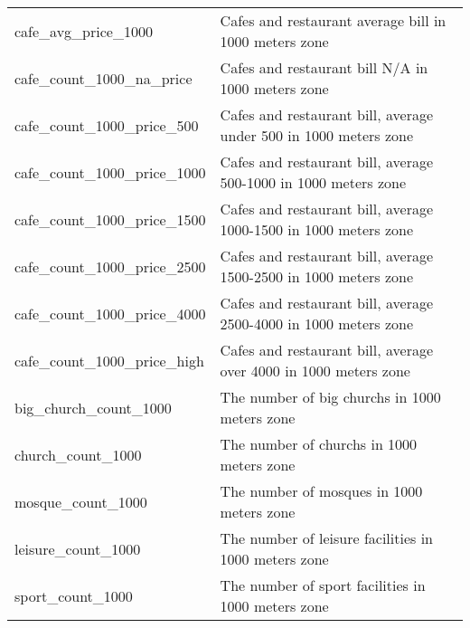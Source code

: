 \begin{longtable}[c]{ll}
    cafe\_avg\_price\_1000                     & Cafes and restaurant average bill in 1000 meters zone                                                                     \\
    cafe\_count\_1000\_na\_price               & Cafes and restaurant bill N/A in 1000 meters zone                                                                         \\
    cafe\_count\_1000\_price\_500              & Cafes and restaurant bill, average under 500 in 1000 meters zone                                                          \\
    cafe\_count\_1000\_price\_1000             & Cafes and restaurant bill, average  500-1000 in 1000 meters zone                                                          \\
    cafe\_count\_1000\_price\_1500             & Cafes and restaurant bill, average  1000-1500 in 1000 meters zone                                                         \\
    cafe\_count\_1000\_price\_2500             & Cafes and restaurant bill, average  1500-2500 in 1000 meters zone                                                         \\
    cafe\_count\_1000\_price\_4000             & Cafes and restaurant bill, average  2500-4000 in 1000 meters zone                                                         \\
    cafe\_count\_1000\_price\_high             & Cafes and restaurant bill, average  over 4000 in 1000 meters zone                                                         \\
    big\_church\_count\_1000                   & The number of big churchs in 1000 meters zone                                                                             \\
    church\_count\_1000                        & The number of churchs in 1000 meters zone                                                                                 \\
    mosque\_count\_1000                        & The number of mosques in 1000 meters zone                                                                                 \\
    leisure\_count\_1000                       & The number of leisure facilities in 1000 meters zone                                                                      \\
    sport\_count\_1000                         & The number of sport facilities in 1000 meters zone                                                                        \\

\end{longtable}
